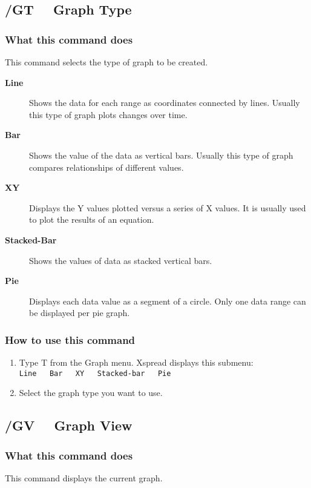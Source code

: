 \subsection*{/GT \ \     Graph Type}

\subsubsection*{What this command does}
This command selects the type of graph to be created.
\begin{description}
\item[{\bf Line}]{Shows the data for each range as coordinates connected
        by lines.  Usually this type of graph plots changes over
        time.}
\item[{\bf Bar}]{Shows the value of the data as vertical bars.
        Usually this type of graph compares relationships of different values.}
\item[{\bf XY  }]{Displays the Y values plotted versus a series of X
        values. It is usually used to plot the results of an equation.}
\item[{\bf Stacked-Bar}]{ Shows the values of data as stacked vertical bars.}
\item[{\bf Pie}]{Displays each data value as a segment of a circle. Only one
        data range can be displayed per pie graph.}
\end{description}
        
\subsubsection*{How to use this command}
\begin{enumerate}
\item{Type T from the Graph menu.  Xspread displays this submenu:\\
        {\tt Line \ \   Bar \ \    XY \ \     Stacked-bar \ \    Pie}}
\item{Select the graph type you want to use.}
\end{enumerate}
        
\subsection*{/GV \ \     Graph View}

\subsubsection*{What this command does}
This command displays the current graph.

